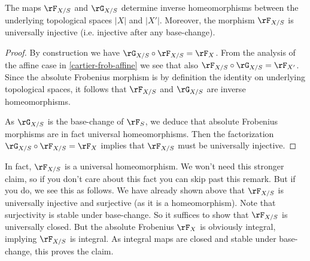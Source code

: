 \begin{proposition}
  \label{cartier-frob-homeo}
  The maps $\rF_{X/S}$ and $\rG_{X/S}$ determine inverse homeomorphisms between the underlying topological spaces $|X|$ and $|X'|$. Moreover, the morphism $\rF_{X/S}$ is universally injective (i.e. injective after any base-change).

  \begin{proof}
    By construction we have $\rG_{X/S} \circ \rF_{X/S} = \rF_X$. From the analysis of the affine case in \cref{cartier-frob-affine} we see that also $\rF_{X/S} \circ \rG_{X/S} = \rF_{X'}$. Since the absolute Frobenius morphism is by definition the identity on underlying topological spaces, it follows that $\rF_{X/S}$ and $\rG_{X/S}$ are inverse homeomorphisms.

    As $\rG_{X/S}$ is the base-change of $\rF_S$, we deduce that absolute Frobenius morphisms are in fact universal homeomorphisms. Then the factorization $\rG_{X/S} \circ \rF_{X/S} = \rF_X$ implies that $\rF_{X/S}$ must be universally injective.
  \end{proof}

  \begin{subremark}
    \label{cartier-frob-homeo-univ}
    In fact, $\rF_{X/S}$ is a universal homeomorphism. We won't need this stronger claim, so if you don't care about this fact you can skip past this remark. But if you do, we see this as follows. We have already shown above that $\rF_{X/S}$ is universally injective and surjective (as it is a homeomorphism). Note that surjectivity is stable under base-change. So it suffices to show that $\rF_{X/S}$ is universally closed. But the absolute Frobenius $\rF_X$ is obviously integral, implying $\rF_{X/S}$ is integral. As integral maps are closed and stable under base-change, this proves the claim.
  \end{subremark}
\end{proposition}

